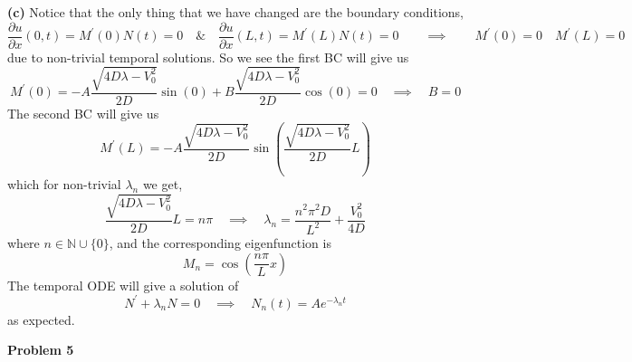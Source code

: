 \documentclass[10pt]{article}
\begin{document}
\textbf{(c)}
Notice that the only thing that we have changed are the boundary conditions,
$$\frac{\partial u}{\partial x}(0,t) = M^{\prime}(0)N(t)= 0 \hspace{1em} \& \hspace{1em} \frac{\partial u}{\partial x}(L,t) = M^{\prime}(L)N(t) =0 \hspace{2em} \implies \hspace{2em} M^{\prime}(0) = 0 \hspace{1em} M^{\prime}(L) = 0$$
due to non-trivial temporal solutions. So we see the first BC will give us
$$M^{\prime}(0) = -A\frac{\sqrt{4D\lambda - V_{0}^{2}}}{2D}\sin(0) + B\frac{\sqrt{4D\lambda - V_{0}^{2}}}{2D}\cos(0) = 0 \hspace{1em} \implies \hspace{1em} B = 0$$
The second BC will give us
$$M^{\prime}(L) = -A\frac{\sqrt{4D\lambda - V_{0}^{2}}}{2D}\sin\left(\frac{\sqrt{4D\lambda - V_{0}^{2}}}{2D}L\right)$$
which for non-trivial $\lambda_{n}$ we get,
$$\frac{\sqrt{4D\lambda - V_{0}^{2}}}{2D}L = n\pi \hspace{1em} \implies \hspace{1em} \lambda_{n} =\frac{n^{2}\pi^{2}D}{L^{2}} + \frac{V_{0}^{2}}{4D}$$
where $n \in \mathbb{N} \cup \{0\}$, and the corresponding eigenfunction is
$$M_{n} = \cos\left(\frac{n\pi}{L}x\right)$$
The temporal ODE will give a solution of
$$N^{\prime} + \lambda_{n}N = 0 \hspace{1em} \implies \hspace{1em} N_{n}(t) = Ae^{-\lambda_{n} t}$$
as expected.

\newpage
\textbf{Problem 5}
\end{document}
